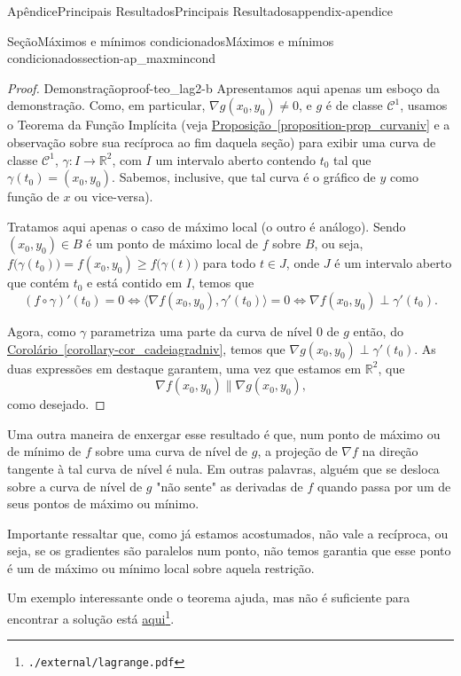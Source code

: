 \documentclass[oneside,10pt,]{book}
\newcommand{\xreffont}{\relax}
\numberwithin{equation}{section}
\newcommand{\R}{\mathbb R}
\begin{document}
\begin{appendixptx}{Apêndice}{Principais Resultados}{}{Principais Resultados}{}{}{appendix-apendice}
\begin{sectionptx}{Seção}{Máximos e mínimos condicionados}{}{Máximos e mínimos condicionados}{}{}{section-ap_maxmincond}
\begin{proof}{Demonstração}{}{proof-teo_lag2-b}
Apresentamos aqui apenas um esboço da demonstração. Como, em particular, \(\nabla g(x_0,y_0)\neq 0\), e \(g\) é de classe \(\mathscr{C}^1\), usamos o Teorema da Função Implícita (veja \hyperref[proposition-prop_curvaniv]{Proposição~{\xreffont\ref{proposition-prop_curvaniv}}} e a observação sobre sua recíproca ao fim daquela seção) para exibir uma curva de classe \(\mathscr{C}^1\), \(\gamma\colon I\to\R^2\), com \(I\) um intervalo aberto contendo \(t_0\) tal que \(\gamma(t_0)=(x_0,y_0)\). Sabemos, inclusive, que tal curva é o gráfico de \(y\) como função de \(x\) ou vice-versa).%
\par
Tratamos aqui apenas o caso de máximo local (o outro é análogo). Sendo \((x_0,y_0)\in B\) é um ponto de máximo local de \(f\) sobre \(B\), ou seja, \(f\big(\gamma(t_0)\big)=f(x_0,y_0)\geq f\big(\gamma(t)\big)\) para todo \(t\in J\), onde \(J\) é um intervalo aberto que contém \(t_0\) e está contido em \(I\), temos que%
\begin{equation*}
(f\circ\gamma)'(t_0)=0\iff \langle\nabla
f(x_0,y_0),\gamma'(t_0)\rangle=0\iff \boxed{\nabla
f(x_0,y_0)\perp\gamma'(t_0)}.
\end{equation*}
%
\par
Agora, como \(\gamma\) parametriza uma parte da curva de nível \(0\) de \(g\) então, do \hyperref[corollary-cor_cadeiagradniv]{Corolário~{\xreffont\ref{corollary-cor_cadeiagradniv}}}, temos que \(\boxed{\nabla g(x_0,y_0)\perp\gamma'(t_0)}\). As duas expressões em destaque garantem, uma vez que estamos em \(\R^2\), que%
\begin{equation*}
\nabla f(x_0,y_0)\parallel\nabla
g(x_0,y_0)\text{,}
\end{equation*}
como desejado.%
\end{proof}
Uma outra maneira de enxergar esse resultado é que, num ponto de máximo ou de mínimo de \(f\) sobre uma curva de nível de \(g\), a projeção de \(\nabla f\) na direção tangente à tal curva de nível é nula. Em outras palavras, alguém que se desloca sobre a curva de nível de \(g\) "não sente" as derivadas de \(f\) quando passa por um de seus pontos de máximo ou mínimo.%
\par
Importante ressaltar que, como já estamos acostumados, não vale a recíproca, ou seja, se os gradientes são paralelos num ponto, não temos garantia que esse ponto é um de máximo ou mínimo local sobre aquela restrição.%
\par
Um exemplo interessante onde o teorema ajuda, mas não é suficiente para encontrar a solução está \href{./external/lagrange.pdf}{aqui}\footnote{\nolinkurl{./external/lagrange.pdf}\label{fn-ap_maxmincond-m-b}}.%

\end{sectionptx}
\end{appendixptx}
\end{document}
